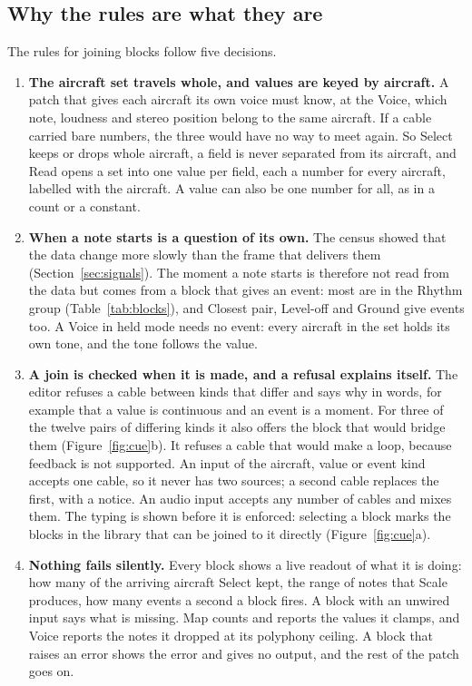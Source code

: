 \documentclass[11pt,letterpaper]{article}
\begin{document}
\subsection{Why the rules are what they are}

The rules for joining blocks follow five decisions.

\begin{enumerate}
\item \textbf{The aircraft set travels whole, and values are keyed by aircraft.} A patch that gives each aircraft its own voice must know, at the Voice, which note, loudness and stereo position belong to the same aircraft. If a cable carried bare numbers, the three would have no way to meet again. So Select keeps or drops whole aircraft, a field is never separated from its aircraft, and Read opens a set into one value per field, each a number for every aircraft, labelled with the aircraft. A value can also be one number for all, as in a count or a constant.

\item \textbf{When a note starts is a question of its own.} The census showed that the data change more slowly than the frame that delivers them (Section~\ref{sec:signals}). The moment a note starts is therefore not read from the data but comes from a block that gives an event: most are in the Rhythm group (Table~\ref{tab:blocks}), and Closest pair, Level-off and Ground give events too. A Voice in held mode needs no event: every aircraft in the set holds its own tone, and the tone follows the value.

\item \textbf{A join is checked when it is made, and a refusal explains itself.} The editor refuses a cable between kinds that differ and says why in words, for example that a value is continuous and an event is a moment. For three of the twelve pairs of differing kinds it also offers the block that would bridge them (Figure~\ref{fig:cue}b). It refuses a cable that would make a loop, because feedback is not supported. An input of the aircraft, value or event kind accepts one cable, so it never has two sources; a second cable replaces the first, with a notice. An audio input accepts any number of cables and mixes them. The typing is shown before it is enforced: selecting a block marks the blocks in the library that can be joined to it directly (Figure~\ref{fig:cue}a).

\item \textbf{Nothing fails silently.} Every block shows a live readout of what it is doing: how many of the arriving aircraft Select kept, the range of notes that Scale produces, how many events a second a block fires. A block with an unwired input says what is missing. Map counts and reports the values it clamps, and Voice reports the notes it dropped at its polyphony ceiling. A block that raises an error shows the error and gives no output, and the rest of the patch goes on.


\end{enumerate}
\end{document}
